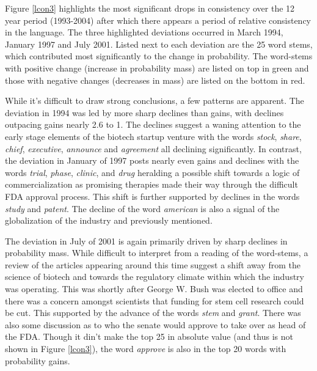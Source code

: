 Figure \ref{lcon3} highlights the most significant drops in consistency over the 12 year period (1993-2004) after which there appears a period of relative consistency in the language. The three highlighted deviations occurred in March 1994, January 1997 and July 2001. Listed next to each deviation are the 25 word stems, which contributed most significantly to the change in probability. The word-stems with positive change (increase in probability mass) are listed on top in green and those with negative changes (decreases in mass) are listed on the bottom in red. 

While it's difficult to draw strong conclusions, a few patterns are apparent. The deviation in 1994 was led by more  sharp declines than gains, with declines outpacing gains nearly 2.6 to 1. The declines suggest a waning attention to the early stage elements of the biotech startup venture with the words \emph{stock}, \emph{share}, \emph{chief}, \emph{executive}, \emph{announce} and \emph{agreement} all declining significantly. In contrast, the deviation in January of 1997 posts nearly even gains and declines with the words \emph{trial}, \emph{phase}, \emph{clinic}, and \emph{drug} heralding a possible shift towards a logic of commercialization as promising therapies made their way through the difficult FDA approval process. This shift is further supported by declines in the words \emph{study} and \emph{patent}. The decline of the word \emph{american} is also a signal of the globalization of the industry and previously mentioned.

The deviation in July of 2001 is again primarily driven by sharp declines in probability mass. While difficult to interpret from a reading of the word-stems, a review of the articles appearing around this time suggest a shift away from the science of biotech and towards the regulatory climate within which the industry was operating. This was shortly after George W. Bush was elected to office and there was a concern amongst scientists that funding for stem cell research could be cut. This supported by the advance of the words \emph{stem} and \emph{grant}. There was also some discussion as to who the senate would approve to take over as head of the FDA. Though it din't make the top 25 in absolute value (and thus is not shown in Figure \ref{lcon3}), the word \emph{approve} is also in the top 20 words with probability gains.


